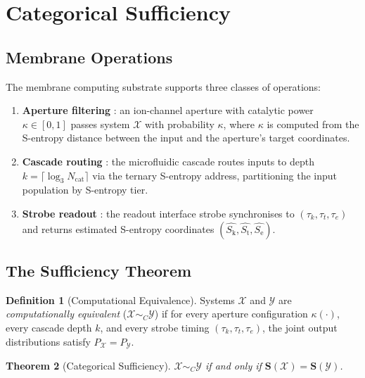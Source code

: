 \documentclass[11pt,twocolumn,a4paper]{article}
\newtheorem{theorem}{Theorem}[section]
\theoremstyle{definition}
\newtheorem{definition}[theorem]{Definition}
\theoremstyle{remark}
\newcommand{\Sk}{S_{\mathrm{k}}}
\newcommand{\St}{S_{\mathrm{t}}}
\newcommand{\Se}{S_{\mathrm{e}}}
\newcommand{\Sent}{\bm{S}}
\begin{document}
\section{Categorical Sufficiency}
\label{sec:sufficiency}

\subsection{Membrane Operations}

The membrane computing substrate supports three classes of operations:

\begin{enumerate}[nosep, label=(\roman*)]
\item \textbf{Aperture filtering} \citep{companion3}: an ion-channel aperture with
  catalytic power $\kappa \in [0,1]$ passes system $\mathcal{X}$ with probability
  $\kappa$, where $\kappa$ is computed from the S-entropy distance between the
  input and the aperture's target coordinates.
\item \textbf{Cascade routing} \citep{companion5}: the microfluidic cascade routes
  inputs to depth $k = \lceil \log_3 N_{\mathrm{cat}} \rceil$ via the ternary
  S-entropy address, partitioning the input population by S-entropy tier.
\item \textbf{Strobe readout} \citep{companion6}: the readout interface strobe
  synchronises to $(\tau_k, \tau_t, \tau_e)$ and returns estimated S-entropy
  coordinates $(\hat{\Sk}, \hat{\St}, \hat{\Se})$.
\end{enumerate}

\subsection{The Sufficiency Theorem}

\begin{definition}[Computational Equivalence]
\label{def:compequiv}
Systems $\mathcal{X}$ and $\mathcal{Y}$ are \emph{computationally equivalent}
($\mathcal{X} \sim_C \mathcal{Y}$) if for every aperture configuration $\kappa(\cdot)$,
every cascade depth $k$, and every strobe timing $(\tau_k, \tau_t, \tau_e)$,
the joint output distributions satisfy $P_{\mathcal{X}} = P_{\mathcal{Y}}$.
\end{definition}

\begin{theorem}[Categorical Sufficiency]
\label{thm:sufficiency}
$\mathcal{X} \sim_C \mathcal{Y}$ if and only if $\Sent(\mathcal{X}) = \Sent(\mathcal{Y})$.
\end{theorem}
\end{document}
